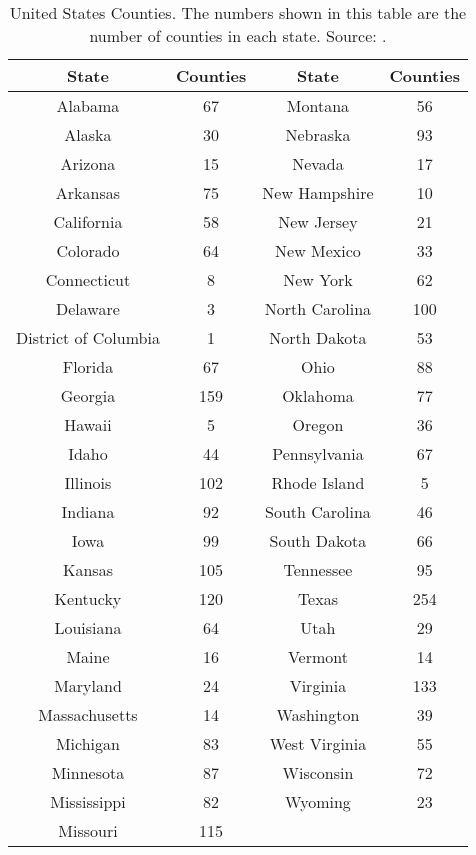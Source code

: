 \begin{center}
    \begin{table}[h]
    \caption[United States Counties]{United States Counties.  The numbers shown in this table are the number of counties in each state. Source: \cite{totalcountynumbers}.} \label{tab:CountiesByState}
    \begin{center}
     \begin{tabular}{||c | c | c | c||} 
     \hline 
     \textbf{State} & \textbf{Counties} & \textbf{State} &\textbf{Counties} \\ [0.5ex] 
     \hline\hline
     Alabama & 67 & Montana & 56  \\ 
     \hline
     Alaska & 30 & Nebraska & 93 \\
     \hline
     Arizona & 15 & Nevada & 17 \\
     \hline
     Arkansas & 75 & New Hampshire & 10 \\
     \hline
     California & 58 &  New Jersey & 21  \\
     \hline
     Colorado & 64 &  New Mexico & 33 \\
     \hline
     Connecticut & 8 & New York & 62 \\
     \hline
     Delaware & 3 & North Carolina & 100  \\
     \hline
     District of Columbia & 1 &  North Dakota & 53 \\
     \hline
     Florida & 67 & Ohio & 88 \\
     \hline
     Georgia & 159 &  Oklahoma & 77 \\
     \hline
     Hawaii & 5 & Oregon & 36 \\ 
     \hline
     Idaho & 44 & Pennsylvania & 67 \\
     \hline
     Illinois & 102 & Rhode Island & 5\\ 
     \hline
     Indiana & 92 & South Carolina & 46 \\ 
     \hline
     Iowa & 99 & South Dakota & 66 \\
     \hline
     Kansas & 105 & Tennessee & 95 \\
     \hline
     Kentucky & 120 & Texas & 254 \\
     \hline
     Louisiana & 64 & Utah & 29 \\
     \hline
     Maine & 16 & Vermont & 14 \\
     \hline
     Maryland & 24 & Virginia & 133 \\
     \hline
     Massachusetts & 14 & Washington & 39 \\
     \hline
     Michigan & 83 & West Virginia & 55 \\ 
     \hline
     Minnesota & 87 & Wisconsin & 72 \\
     \hline
     Mississippi & 82 &  Wyoming & 23 \\
     \hline
     Missouri & 115 & & \\ [1ex] 
     \hline
    \end{tabular}
    \end{center}
    \end{table}

\end{center}

